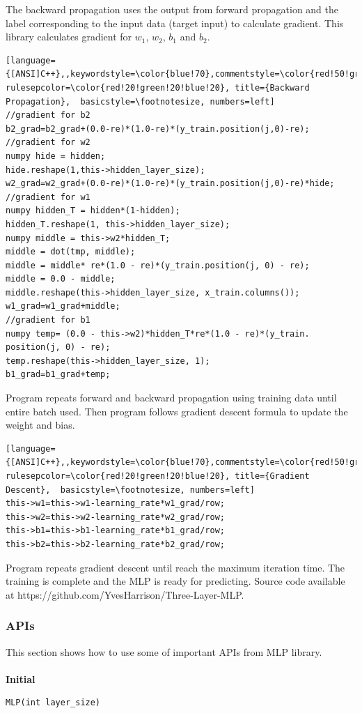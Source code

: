 \documentclass[a4paper]{article}
\begin{document}
The backward propagation uses the output from forward propagation and the label corresponding to the input data (target input) to calculate gradient. This library calculates gradient for $w_{1}$, $w_{2}$, $b_{1}$ and $b_{2}$.
\begin{lstlisting}[language={[ANSI]C++},,keywordstyle=\color{blue!70},commentstyle=\color{red!50!green!50!blue!50},frame=shadowbox, rulesepcolor=\color{red!20!green!20!blue!20}, title={Backward Propagation},  basicstyle=\footnotesize, numbers=left]  
//gradient for b2
b2_grad=b2_grad+(0.0-re)*(1.0-re)*(y_train.position(j,0)-re);
//gradient for w2		
numpy hide = hidden;
hide.reshape(1,this->hidden_layer_size);
w2_grad=w2_grad+(0.0-re)*(1.0-re)*(y_train.position(j,0)-re)*hide;
//gradient for w1		
numpy hidden_T = hidden*(1-hidden);
hidden_T.reshape(1, this->hidden_layer_size);
numpy middle = this->w2*hidden_T;
middle = dot(tmp, middle);
middle = middle* re*(1.0 - re)*(y_train.position(j, 0) - re);
middle = 0.0 - middle;
middle.reshape(this->hidden_layer_size, x_train.columns());
w1_grad=w1_grad+middle;
//gradient for b1
numpy temp= (0.0 - this->w2)*hidden_T*re*(1.0 - re)*(y_train.
position(j, 0) - re);
temp.reshape(this->hidden_layer_size, 1);
b1_grad=b1_grad+temp;
\end{lstlisting}

Program repeats forward and backward propagation using training data until entire batch used. Then program follows gradient descent formula to update the weight and bias.
\begin{lstlisting}[language={[ANSI]C++},,keywordstyle=\color{blue!70},commentstyle=\color{red!50!green!50!blue!50},frame=shadowbox, rulesepcolor=\color{red!20!green!20!blue!20}, title={Gradient Descent},  basicstyle=\footnotesize, numbers=left]  
this->w1=this->w1-learning_rate*w1_grad/row;
this->w2=this->w2-learning_rate*w2_grad/row;
this->b1=this->b1-learning_rate*b1_grad/row;
this->b2=this->b2-learning_rate*b2_grad/row;
\end{lstlisting}

Program repeats gradient descent until reach the maximum iteration time. The training is complete and the MLP is ready for predicting. Source code available at https://github.com/YvesHarrison/Three-Layer-MLP.

\subsubsection{APIs}
This section shows how to use some of important APIs from MLP library.\\\\
\textbf{\Large Initial}
\begin{lstlisting}[language={[ANSI]C++},keywordstyle=\color{blue!70},commentstyle=\color{red!50!green!50!blue!50},frame=shadowbox, rulesepcolor=\color{red!20!green!20!blue!20}]
MLP(int layer_size)
\end{lstlisting}
\end{document}
